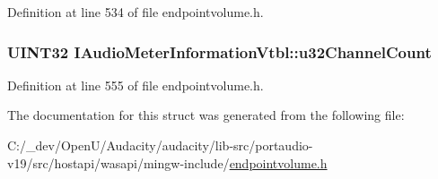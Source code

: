 Definition at line 534 of file endpointvolume.\+h.

\subsubsection[{\texorpdfstring{u32\+Channel\+Count}{u32ChannelCount}}]{\setlength{\rightskip}{0pt plus 5cm}U\+I\+N\+T32 I\+Audio\+Meter\+Information\+Vtbl\+::u32\+Channel\+Count}\hypertarget{struct_i_audio_meter_information_vtbl_a56cb77e40e88809fb9d42c5879807354}{}\label{struct_i_audio_meter_information_vtbl_a56cb77e40e88809fb9d42c5879807354}


Definition at line 555 of file endpointvolume.\+h.



The documentation for this struct was generated from the following file\+:\begin{DoxyCompactItemize}
\item 
C\+:/\+\_\+dev/\+Open\+U/\+Audacity/audacity/lib-\/src/portaudio-\/v19/src/hostapi/wasapi/mingw-\/include/\hyperlink{endpointvolume_8h}{endpointvolume.\+h}\end{DoxyCompactItemize}
